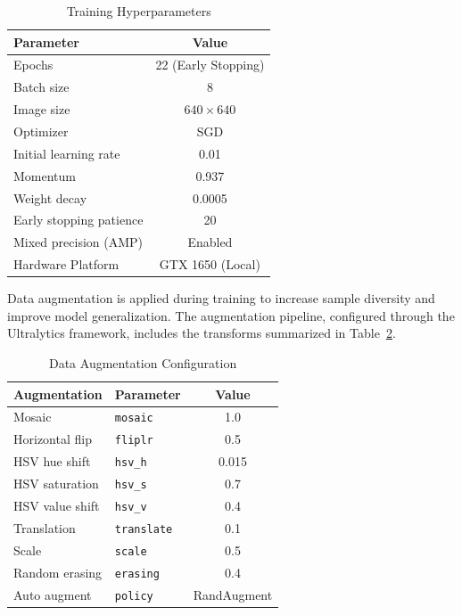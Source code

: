 \documentclass[conference]{IEEEtran}
\begin{document}
\begin{table}[!t]
\caption{Training Hyperparameters}
\label{tab:hyperparams}
\centering
\begin{tabular}{@{}l c@{}}
\toprule
\textbf{Parameter} & \textbf{Value} \\
\midrule
Epochs                  & 22 (Early Stopping) \\
Batch size              & 8 \\
Image size              & $640 \times 640$ \\
Optimizer               & SGD \\
Initial learning rate   & 0.01 \\
Momentum                & 0.937 \\
Weight decay            & 0.0005 \\
Early stopping patience & 20 \\
Mixed precision (AMP)   & Enabled \\
Hardware Platform       & GTX 1650 (Local) \\
\bottomrule
\end{tabular}
\end{table}

Data augmentation is applied during training to increase sample diversity and improve model generalization. The augmentation pipeline, configured through the Ultralytics framework, includes the transforms summarized in Table~\ref{tab:augmentation}.

\begin{table}[!t]
\caption{Data Augmentation Configuration}
\label{tab:augmentation}
\centering
\begin{tabular}{@{}l l c@{}}
\toprule
\textbf{Augmentation} & \textbf{Parameter} & \textbf{Value} \\
\midrule
Mosaic          & \texttt{mosaic}    & 1.0 \\
Horizontal flip & \texttt{fliplr}    & 0.5 \\
HSV hue shift   & \texttt{hsv\_h}    & 0.015 \\
HSV saturation  & \texttt{hsv\_s}    & 0.7 \\
HSV value shift & \texttt{hsv\_v}    & 0.4 \\
Translation     & \texttt{translate} & 0.1 \\
Scale           & \texttt{scale}     & 0.5 \\
Random erasing  & \texttt{erasing}   & 0.4 \\
Auto augment    & \texttt{policy}    & RandAugment \\
\bottomrule
\end{tabular}
\end{table}
\end{document}
